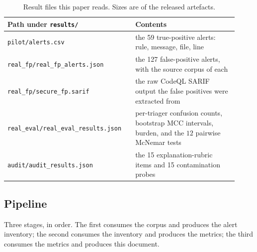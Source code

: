 \documentclass[journal]{IEEEtran}
\theoremstyle{definition}
\newcommand{\Nrubric}{15}
\newcommand{\Nprobe}{15}
\newcommand{\RNtp}{59}
\newcommand{\RNfp}{127}
\begin{document}
\begin{table}[h]
\centering
\caption{Result files this paper reads. Sizes are of the released artefacts.}
\label{tab:inputs}
\footnotesize
\setlength{\tabcolsep}{4pt}
\begin{tabular}{@{}>{\raggedright\arraybackslash}p{0.50\linewidth}>{\raggedright\arraybackslash}p{0.42\linewidth}@{}}
\toprule
Path under \texttt{results/} & Contents \\
\midrule
\texttt{pilot/\allowbreak{}alerts.\allowbreak{}csv} &
  the \RNtp{} true-positive alerts: rule, message, file, line \\
\texttt{real\_\allowbreak{}fp/\allowbreak{}real\_\allowbreak{}fp\_\allowbreak{}alerts.\allowbreak{}json} &
  the \RNfp{} false-positive alerts, with the source corpus of each \\
\texttt{real\_\allowbreak{}fp/\allowbreak{}secure\_\allowbreak{}fp.\allowbreak{}sarif} &
  the raw CodeQL SARIF output the false positives were extracted from \\
\texttt{real\_\allowbreak{}eval/\allowbreak{}real\_\allowbreak{}eval\_\allowbreak{}results.\allowbreak{}json} &
  per-triager confusion counts, bootstrap MCC intervals, burden, and the
  \(12\) pairwise McNemar tests \\
\texttt{audit/\allowbreak{}audit\_\allowbreak{}results.\allowbreak{}json} &
  the \Nrubric{} explanation-rubric items and \Nprobe{} contamination probes \\
\bottomrule
\end{tabular}
\end{table}

\subsection{Pipeline}

Three stages, in order. The first consumes the corpus and produces the alert
inventory; the second consumes the inventory and produces the metrics; the third
consumes the metrics and produces this document.
\end{document}
